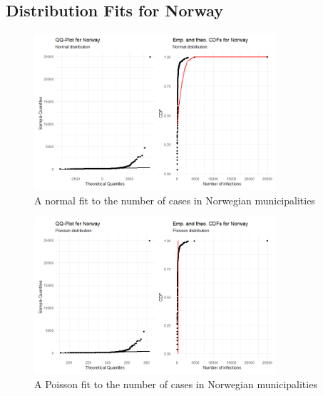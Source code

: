 \subsection{Distribution Fits for Norway}
%     
\begin{figure}[H]
    \centering
    \includegraphics[width = 0.8\textwidth]{fit_normal_norway.png}
    \caption{A normal fit to the number of cases in Norwegian municipalities}
    \label{fitNormalNorway}
\end{figure}
%     
\begin{figure}[H]
    \centering
    \includegraphics[width = 0.8\textwidth]{fit_poisson_norway.png}
    \caption{A Poisson fit to the number of cases in Norwegian municipalities}
    \label{fitPoissonNorway}
\end{figure}
\clearpage
